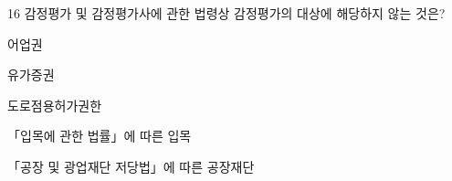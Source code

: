 \begin{question}{16}
감정평가 및 감정평가사에 관한 법령상 감정평가의 대상에 해당하지 않는 것은?
\begin{choices}
  \item 어업권
  \item 유가증권
  \item 도로점용허가권한
  \item 「입목에 관한 법률」에 따른 입목
  \item 「공장 및 광업재단 저당법」에 따른 공장재단
\end{choices}
\end{question}
